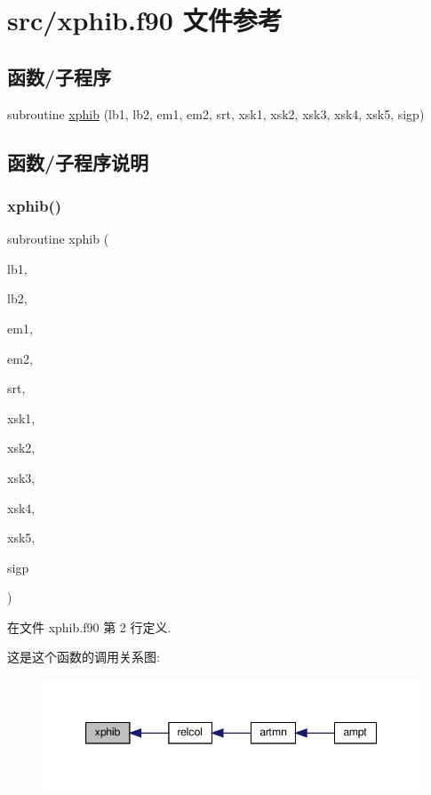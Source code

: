 \hypertarget{xphib_8f90}{}\section{src/xphib.f90 文件参考}
\label{xphib_8f90}
\subsection*{函数/子程序}
\begin{DoxyCompactItemize}
\item 
subroutine \mbox{\hyperlink{xphib_8f90_ae8f8eab097c60d5a331229b34c2ccaf1}{xphib}} (lb1, lb2, em1, em2, srt, xsk1, xsk2, xsk3, xsk4, xsk5, sigp)
\end{DoxyCompactItemize}


\subsection{函数/子程序说明}
\mbox{\label{xphib_8f90_ae8f8eab097c60d5a331229b34c2ccaf1}} 
\subsubsection{\texorpdfstring{xphib()}{xphib()}}
{\footnotesize\ttfamily subroutine xphib (\begin{DoxyParamCaption}\item[{}]{lb1,  }\item[{}]{lb2,  }\item[{}]{em1,  }\item[{}]{em2,  }\item[{}]{srt,  }\item[{}]{xsk1,  }\item[{}]{xsk2,  }\item[{}]{xsk3,  }\item[{}]{xsk4,  }\item[{}]{xsk5,  }\item[{}]{sigp }\end{DoxyParamCaption})}



在文件 xphib.\+f90 第 2 行定义.

这是这个函数的调用关系图\+:
\nopagebreak
\begin{figure}[H]
\begin{center}
\leavevmode
\includegraphics[width=347pt]{xphib_8f90_ae8f8eab097c60d5a331229b34c2ccaf1_icgraph}
\end{center}
\end{figure}
